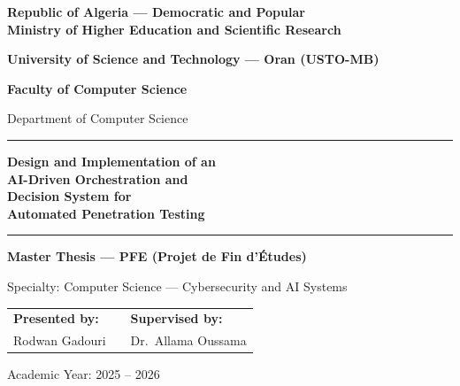 \documentclass[12pt,a4paper,oneside,openany]{book}
\begin{document}
\frontmatter
{}

\begin{titlepage}
\begin{center}
\vspace*{0.5cm}
{\large\bfseries Republic of Algeria — Democratic and Popular\\[0.2em]
Ministry of Higher Education and Scientific Research\par}
\vspace{0.3cm}
{\large\bfseries University of Science and Technology — Oran (USTO-MB)\par}
\vspace{0.2cm}
{\large\bfseries Faculty of Computer Science\par}
\vspace{0.2cm}
{\normalsize Department of Computer Science\par}
\vspace{1.0cm}
\rule{\textwidth}{1pt}
\vspace{0.5cm}

{\Huge\bfseries\color{navy}
Design and Implementation of an\\[0.3em]
AI-Driven Orchestration and\\[0.3em]
Decision System for\\[0.3em]
Automated Penetration Testing\par}
\vspace{0.5cm}
\rule{\textwidth}{1pt}
\vspace{1.0cm}

{\Large\bfseries\color{darkblue}
Master Thesis — PFE (Projet de Fin d'Études)\par}
\vspace{0.3cm}
{\large Specialty: Computer Science — Cybersecurity and AI Systems\par}

\vspace{1.5cm}
\begin{tabular}{lcl}
{\large\bfseries Presented by:} & \hspace{3cm} & {\large\bfseries Supervised by:} \\[0.4cm]
{\large Rodwan Gadouri}         & & {\large Dr.~Allama Oussama} \\
\end{tabular}

\vfill
{\large Academic Year: 2025 -- 2026\par}
\end{center}
\end{titlepage}
\end{document}
